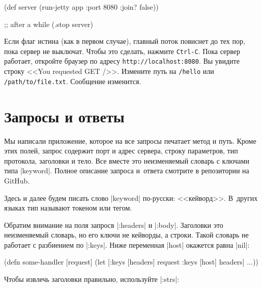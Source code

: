\begin{english}
  \begin{clojure}
(def server
  (run-jetty app {:port 8080 :join? false}))

;; after a while
(.stop server)
  \end{clojure}
\end{english}

Если флаг истина (как в первом случае), главный поток повиснет до тех пор, пока
сервер не выключат. Чтобы это сделать, нажмите \verb|Ctrl-C|. Пока сервер
работает, откройте браузер по адресу \verb|http://localhost:8080|. Вы увидите
строку <<You requested GET />>. Измените путь на \verb|/hello| или
\verb|/path/to/file.txt|. Сообщение изменится.

\section{Запросы и ответы}

Мы написали приложение, которое на все запросы печатает метод и путь. Кроме этих
полей, запрос содержит порт и адрес сервера, строку параметров, тип протокола,
заголовки и тело. Все вместе это неизменяемый словарь с ключами типа
\spverb|keyword|. Полное описание запроса и~ответа смотрите в репозитории на
GitHub.


Здесь и далее будем писать слово \spverb|keyword| по-русски:
<<кейворд>>. В~других языках тип называют токеном или тегом.


Обратим внимание на поля запросв \spverb|:headers| и \spverb|:body|. Заголовки
это неизменяемый словарь, но его ключи не кейворды, а строки. Такой словарь не
работает с разбиением по \spverb|:keys|. Ниже переменная \spverb|host| окажется
равна \spverb|nil|:


\begin{english}
  \begin{clojure}
(defn some-handler
  [request]
  (let [{:keys [headers]} request
        {:keys [host]} headers]
    ...))
  \end{clojure}
\end{english}


\noindent
Чтобы извлечь заголовки правильно, используйте \spverb|:strs|:

